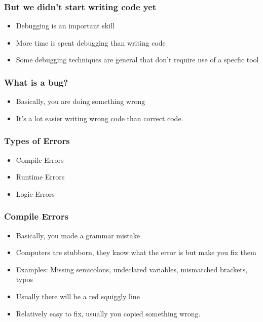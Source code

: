 \documentclass[aspectratio=169,hyperref={unicode}]{beamer}
\begin{document}
\begin{frame}
\frametitle{But we didn't start writing code yet}
\begin{itemize}
  \item Debugging is an important skill
  \item More time is spent debugging than writing code
        \item Some debugging techniques are general that don't require use of a specfic tool
\end{itemize}
\end{frame}


\begin{frame}
\frametitle{What is a bug?}
\begin{itemize}
        \item Basically, you are doing something wrong
\item It's a lot easier writing wrong code than correct code.
\end{itemize}
\end{frame}

\begin{frame}
\frametitle{Types of Errors}
\begin{itemize}
\item Compile Errors
\item Runtime Errors
\item Logic Errors
\end{itemize}
\end{frame}

\begin{frame}
\frametitle{Compile Errors}
\begin{itemize}
\item Basically, you made a grammar mistake
\item Computers are stubborn, they know what the error is but make you fix them
\item Examples: Missing semicolons, undeclared variables, mismatched brackets, typos
  \item Usually there will be a red squiggly line
        \item Relatively easy to fix, usually you copied something wrong.
\end{itemize}
\end{frame}
\end{document}
